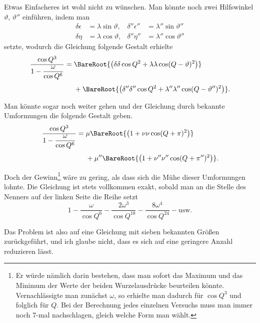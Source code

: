 Etwas Einfacheres ist wohl nicht zu wünschen. Man könnte noch zwei Hilfswinkel \(\vartheta\), \(\vartheta''\) einführen, indem man
\[
\begin{aligned}
\delta\epsilon&=\lambda\sin\vartheta, &\delta''\epsilon''&=\lambda''\sin\vartheta''\\
\delta\eta&=\lambda\cos\vartheta, &\delta''\eta''&=\lambda''\cos\vartheta''
\end{aligned}
\]
setzte, wodurch die Gleichung folgende Gestalt erhielte
\[
\begin{aligned}
\frac{\cos Q^3}{1-\dfrac\omega{\cos Q^6}}={}&\BareRoot{\bigl(\delta\delta\cos Q^2+\lambda\lambda\cos(Q-\vartheta)^2\bigr)}\\[4pt]
&+\BareRoot{\bigl(\delta''\delta''\cos Q^2+\lambda''\lambda''\cos(Q-\vartheta'')^2\bigr)}.
\end{aligned}
\]

Man könnte sogar noch weiter gehen und der Gleichung durch bekannte Umformungen die folgende Gestalt geben.
\[
\begin{aligned}
\frac{\cos Q^3}{1-\dfrac\omega{\cos Q^6}}={}&\mu\BareRoot{\bigl(1+\nu\nu\cos(Q+\pi)^2\bigr)}\\[4pt]
&+\mu''\BareRoot{\bigl(1+\nu''\nu''\cos(Q+\pi'')^2\bigr)}.
\end{aligned}
\]

Doch der Gewinn\footnote{Er würde nämlich  darin bestehen, dass man sofort das Maximum und das Minimum der Werte der beiden Wurzelausdrücke beurteilen könnte. Vernachlässigte man zunächst \(\omega\), so erhielte man dadurch  für \(\cos Q^3\) und folglich für \(Q\). Bei der Berechnung jedes einzelnen Versuchs muss man immer noch 7-mal nachschlagen, gleich welche Form man wählt.} wäre zu gering, als dass sich die Mühe dieser Umformungen lohnte. Die Gleichung ist stets vollkommen exakt, sobald man an die Stelle des Nenners auf der linken Seite die Reihe setzt
\[
1-\frac\omega{\cos Q^6}-\frac{2\omega^3}{\cos Q^{18}}-\frac{8\omega^4}{\cos Q^{24}}-\text{usw.}
\]

Das Problem ist also auf eine Gleichung mit sieben bekannten Größen zurückgeführt, und ich glaube nicht, dass es sich auf eine geringere Anzahl reduzieren lässt.

